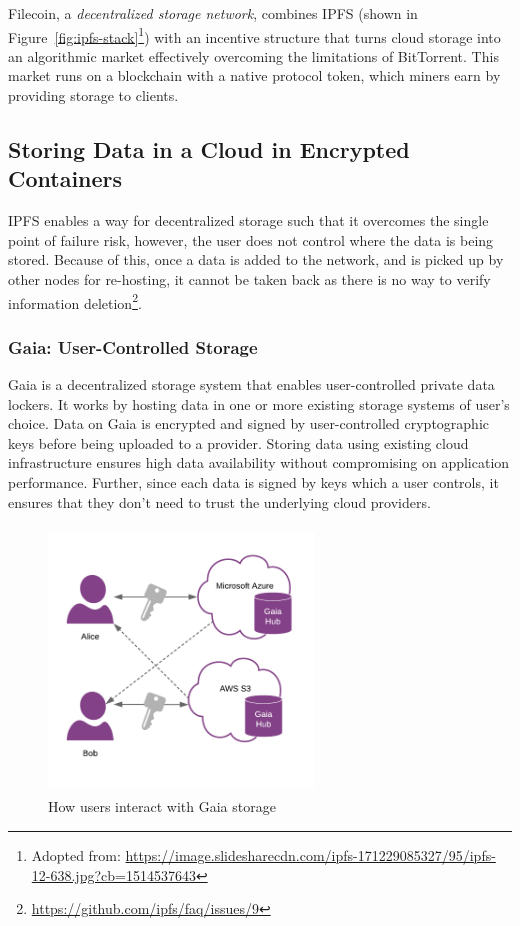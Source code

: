 			Filecoin\cite{benet2018filecoin}, a \textit{decentralized storage network}, combines IPFS (shown in Figure~\ref{fig:ipfs-stack}\footnote{Adopted from: \url{https://image.slidesharecdn.com/ipfs-171229085327/95/ipfs-12-638.jpg?cb=1514537643}}) with an incentive structure that turns cloud storage into an algorithmic market effectively overcoming the limitations of BitTorrent. This market runs on a blockchain with a native protocol token, which miners earn by providing storage to clients.
		
	\subsection{Storing Data in a Cloud in Encrypted Containers}
		IPFS enables a way for decentralized storage such that it overcomes the single point of failure risk, however, the user does not control where the data is being stored. Because of this, once a data is added to the network, and is picked up by other nodes for re-hosting, it cannot be taken back as there is no way to verify information deletion\footnote{\url{https://github.com/ipfs/faq/issues/9}}.
		
		\subsubsection{Gaia: User-Controlled Storage}
		Gaia\cite{ali2016blockstack} is a decentralized storage system that enables user-controlled private data lockers. It works by hosting data in one or more existing storage systems of user's choice. Data on Gaia is encrypted and signed by user-controlled cryptographic keys before being uploaded to a provider. Storing data using existing cloud infrastructure ensures high data availability without compromising on application performance. Further, since each data is signed by keys which a user controls, it ensures that they don't need to trust the underlying cloud providers.
		
		\begin{figure}[h]
			\centering
			\includegraphics[width=200pt, height=200pt]{figures/gaia-storage}
			\caption{\label{fig:gaia-storage} How users interact with Gaia storage\protect\footnotemark}
		\end{figure}
		
